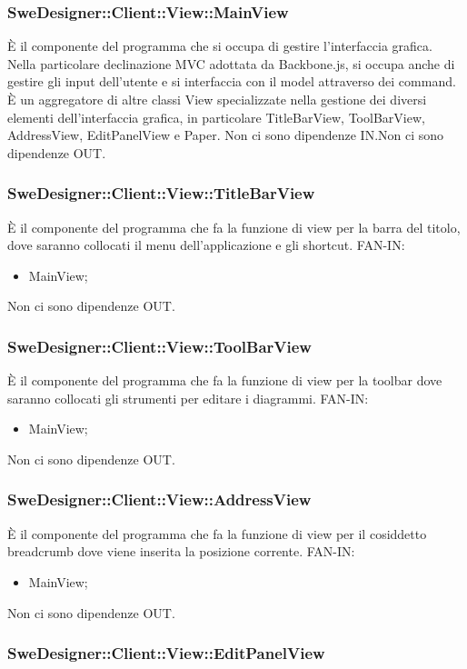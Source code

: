\documentclass[../PianoDiQualifica.tex]{subfiles}
\begin{document}
		\subsubsection{SweDesigner::Client::View::MainView}
		È il componente del programma che si occupa di gestire l'interfaccia grafica. Nella particolare declinazione MVC adottata da Backbone.js, si occupa anche di gestire gli input dell'utente e si interfaccia con il model attraverso dei command. È un aggregatore di altre classi View specializzate nella gestione dei diversi elementi dell'interfaccia grafica, in particolare TitleBarView, ToolBarView, AddressView, EditPanelView e Paper.
		Non ci sono dipendenze IN.Non ci sono dipendenze OUT.\subsubsection{SweDesigner::Client::View::TitleBarView}
		È il componente del programma che fa la funzione di view per la barra del titolo, dove saranno collocati il menu dell’applicazione e gli shortcut.
		FAN-IN:
		\begin{itemize}
			\item MainView;
		\end{itemize}
		Non ci sono dipendenze OUT.\subsubsection{SweDesigner::Client::View::ToolBarView}
		È il componente del programma che fa la funzione di view per la toolbar dove saranno collocati gli strumenti per editare i diagrammi.
		FAN-IN:
		\begin{itemize}
			\item MainView;
		\end{itemize}
		Non ci sono dipendenze OUT.\subsubsection{SweDesigner::Client::View::AddressView}
		È il componente del programma che fa la funzione di view per il cosiddetto breadcrumb dove viene inserita la posizione corrente.
		FAN-IN:
		\begin{itemize}
			\item MainView;
		\end{itemize}
		Non ci sono dipendenze OUT.\subsubsection{SweDesigner::Client::View::EditPanelView}
\end{document}
